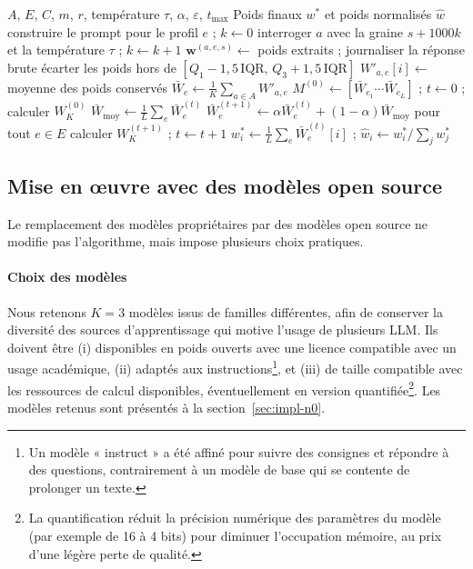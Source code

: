 \documentclass[11pt,a4paper]{article}
\newcommand{\Wbar}{\bar{W}}
\newcommand{\Wmoy}{\bar{W}_{\mathrm{moy}}}
\begin{document}
\begin{algorithm}[htbp]
\caption{WALMAS avec modèles open source}\label{alg:walmas}
\begin{algorithmic}[1]
\Require $A$, $E$, $C$, $m$, $r$, température $\tau$, $\alpha$, $\varepsilon$, $t_{\max}$
\Ensure Poids finaux $w^*$ et poids normalisés $\hat w$
    \State construire le prompt pour le profil $e$ ; $k\gets 0$
    \Repeat
      \State interroger $a$ avec la graine $s+1000k$ et la température $\tau$ ; $k\gets k+1$
     
    \State $\mathbf{w}^{(a,e,s)}\gets$ poids extraits ; journaliser la réponse brute
  \EndFor
    \State écarter les poids hors de $[Q_1-1{,}5\,\mathrm{IQR},\,Q_3+1{,}5\,\mathrm{IQR}]$
    \State $W'_{a,e}[i]\gets$ moyenne des poids conservés
  \EndFor
\EndFor
{}
  \State $\Wbar_e\gets\frac{1}{K}\sum_{a\in A}W'_{a,e}$
\EndFor
\State $M^{(0)}\gets[\Wbar_{e_1}\cdots\Wbar_{e_L}]$ ; $t\gets0$ ; calculer $W_K^{(0)}$
\Repeat
  \State $\Wmoy\gets\frac{1}{L}\sum_e\Wbar_e^{(t)}$
  \State $\Wbar_e^{(t+1)}\gets\alpha\Wbar_e^{(t)}+(1-\alpha)\Wmoy$ pour tout $e\in E$
  \State calculer $W_K^{(t+1)}$ ; $t\gets t+1$
\State $w_i^*\gets\frac{1}{L}\sum_e\Wbar_e^{(t)}[i]$ ; $\hat w_i\gets w_i^*/\sum_j w_j^*$
\end{algorithmic}
\end{algorithm}

\subsection{Mise en œuvre avec des modèles open source}

Le remplacement des modèles propriétaires par des modèles open source ne modifie pas l'algorithme, mais impose plusieurs choix pratiques.

\paragraph{Choix des modèles} Nous retenons $K=3$ modèles issus de familles différentes, afin de conserver la diversité des sources d'apprentissage qui motive l'usage de plusieurs LLM. Ils doivent être (i) disponibles en poids ouverts avec une licence compatible avec un usage académique, (ii) adaptés aux instructions\footnote{Un modèle « instruct » a été affiné pour suivre des consignes et répondre à des questions, contrairement à un modèle de base qui se contente de prolonger un texte.}, et (iii) de taille compatible avec les ressources de calcul disponibles, éventuellement en version quantifiée\footnote{La quantification réduit la précision numérique des paramètres du modèle (par exemple de 16 à 4 bits) pour diminuer l'occupation mémoire, au prix d'une légère perte de qualité.}. Les modèles retenus sont présentés à la section~\ref{sec:impl-n0}.
\end{document}
